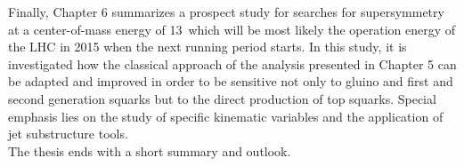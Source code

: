 Finally, Chapter 6 summarizes a prospect study for searches for supersymmetry at a center-of-mass energy of 13~\tev which will be most likely the operation energy of the LHC in 2015 when the next running period starts. In this study, it is investigated how the classical approach of the analysis presented in Chapter 5 can be adapted and improved in order to be sensitive not only to gluino and first and second generation squarks but to the direct production of top squarks. Special emphasis lies on the study of specific kinematic variables and the application of jet substructure tools. \\ The thesis ends with a short summary and outlook.  
